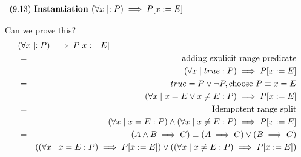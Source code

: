 $\begin{array}{l@{\quad}l}
   (9.13)~\textbf{Instantiation } 
   (\forall x \mid: P) \implies P[x:=E]
\end{array}$\newline\newline

Can we prove this?
\begin{eqnarray*}
   \lefteqn{(\forall x \mid: P) \implies P[x:=E]}
\\&=& \text{adding explicit range predicate}
\\&& (\forall x \mid true : P) \implies P[x:=E]
\\&=&  true = P \lor \lnot P, \text{choose } P \equiv x=E
\\&& (\forall x \mid x=E \lor x \neq E : P) \implies P[x:=E]
\\&=& \text{Idempotent range split}
\\&& (\forall x \mid x=E : P) \land (\forall x \mid x \neq E : P) 
     \implies P[x:=E]
\\&=&  (A\land B \implies C) \equiv (A\implies C)\lor(B\implies C)
\\&& ((\forall x \mid x=E : P) \implies P[x:=E])
     \lor
     ((\forall x \mid x \neq E : P) \implies P[x:=E])
\end{eqnarray*}

